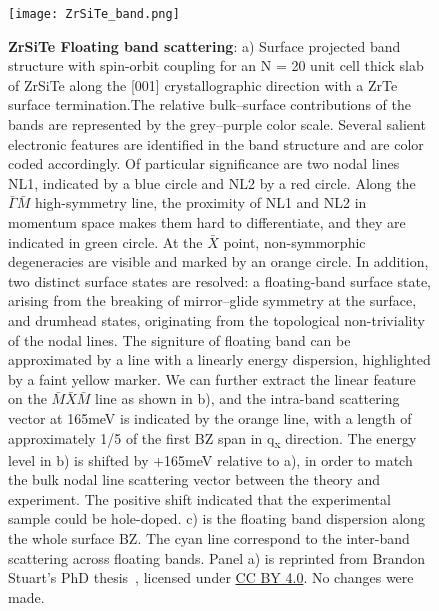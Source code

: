 \begin{figure}
	\texttt{[image: ZrSiTe\_band.png]} 
	\centering
	\captionsetup{width=1.5\textwidth}
	\caption[\textbf{ZrSiTe Floating band scattering}]{\textbf{ZrSiTe Floating band scattering}: a) Surface projected band structure with spin-orbit coupling for an N = 20 unit cell thick slab of ZrSiTe along the [001] crystallographic direction with a ZrTe surface termination.The relative bulk–surface contributions of the bands are represented by the grey–purple color scale. Several salient electronic features are identified in the band structure and are color coded accordingly. Of particular significance are two nodal lines NL1, indicated by a blue circle and NL2 by a red circle. Along the $\bar{\Gamma}\bar{M}$ high-symmetry line, the proximity of NL1 and NL2 in momentum space makes them hard to differentiate, and they are indicated in green circle. At the $\bar{X}$ point, non-symmorphic degeneracies are visible and marked by an orange circle. In addition, two distinct surface states are resolved: a floating-band surface state, arising from the breaking of mirror–glide symmetry at the surface, and drumhead states, originating from the topological non-triviality of the nodal lines. The signiture of floating band can be approximated by a line with a linearly energy dispersion, highlighted by a faint yellow marker. We can further extract the linear feature on the $\bar{M}\bar{X}\bar{M}$ line as shown in b), and the intra-band scattering vector at 165meV is indicated by the orange line, with a length of approximately 1/5 of the first \ac{BZ} span in q\textsubscript{x} direction. The energy level in b) is shifted by +165meV relative to a), in order to match the bulk nodal line scattering vector between the theory and experiment. The positive shift indicated that the experimental sample could be hole-doped. c) is the floating band dispersion along the whole surface \ac{BZ}. The cyan line correspond to the inter-band scattering across floating bands. Panel a) is reprinted from Brandon Stuart's PhD thesis~\cite{stuartQuasiparticleInterferenceObservation2022}, licensed under \href{http://creativecommons.org/licenses/by/4.0/}{CC BY 4.0}. No changes were made.}
	\label{fig:ZrSiTe_floatingband}
\end{figure}


